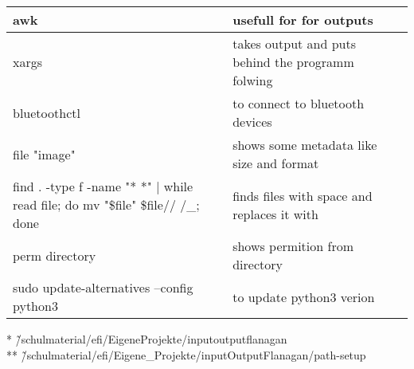 \documentclass[12pt]{article}
\begin{document}
\begin{tabular}{| p{6.5cm} | p{6.5cm} | p{6.5cm} |}
    \hline
    awk & usefull for for outputs \\
    \hline 
    xargs & takes output and puts behind the programm folwing \\
    \hline
    bluetoothctl & to connect to bluetooth devices \\
    \hline
    file "image" & shows some metadata like size and format \\
    \hline
    find . -type f -name "* *" | while read file; do mv "\$file" \${file// /\_}; done & finds files with space and replaces it with \\
    \hline
    perm directory & shows permition from directory \\
    \hline
     sudo update-alternatives --config python3 & to update python3 verion\\
    \hline 


\end{tabular}

* \~/schulmaterial/efi/EigeneProjekte/inputoutputflanagan \\
** \~/schulmaterial/efi/Eigene\_Projekte/inputOutputFlanagan/path-setup 
\end{document}
